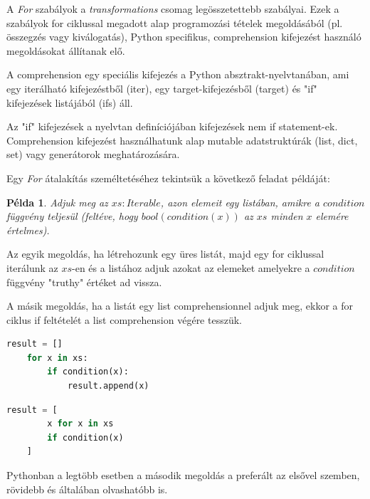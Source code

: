 A \emph{For} szabályok a \emph{transformations} csomag legösszetettebb szabályai.
Ezek a szabályok for ciklussal megadott alap programozási tételek megoldásából
(pl. összegzés vagy kiválogatás), Python specifikus, comprehension kifejezést használó
megoldásokat állítanak elő.

A comprehension egy speciális kifejezés a Python absztrakt-nyelvtanában, ami
egy iterálható kifejezéstből (iter), egy target-kifejezésből (target)
és "if" kifejezések listájából (ifs) áll.

Az "if" kifejezések a nyelvtan definíciójában kifejezések nem if statement-ek.
Comprehension kifejezést használhatunk alap
mutable adatstruktúrák (list, dict, set) vagy generátorok meghatározására.

Egy \emph{For} átalakítás személtetéséhez tekintsük a következő feladat példáját:

\newtheorem{example}{Példa}
\begin{example}
Adjuk meg az $xs: Iterable$, azon elemeit egy listában,
amikre a $condition$ függvény teljesül
(feltéve, hogy $bool(condition(x))$ az $xs$ minden $x$ elemére értelmes).
\end{example}

Az egyik megoldás, ha létrehozunk egy üres listát,
majd egy for ciklussal iterálunk az $xs$-en és
a listához adjuk azokat az elemeket amelyekre a $condition$ függvény
"truthy" értéket ad vissza.

A másik megoldás, ha a listát egy list comprehensionnel adjuk meg,
ekkor a for ciklus if feltételét a list comprehension végére tesszük.

\noindent
\begin{minipage}[t]{.48\textwidth}
\begin{lstlisting}[language={Python}]
	result = []
	for x in xs:
		if condition(x):
			result.append(x)
\end{lstlisting}
\end{minipage}
\hfill
\begin{minipage}[t]{.48\textwidth}
\begin{lstlisting}[language={Python}]
	result = [
		x for x in xs
		if condition(x)
	]
\end{lstlisting}
\end{minipage}

Pythonban a legtöbb esetben a második megoldás a preferált az elsővel szemben,
rövidebb és általában olvashatóbb is.

